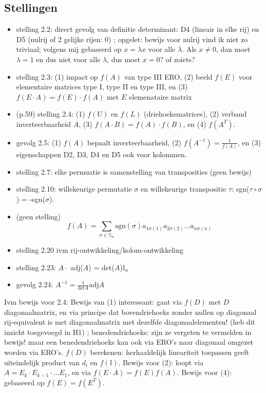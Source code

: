 \documentclass{article}
\begin{document}
\subsection{Stellingen}
\begin{itemize}
    \item stelling 2.2: direct gevolg van definitie determinant: D4 (lineair in elke rij) en D5 (nulrij of 2 gelijke rijen: 0) ; opgelet: bewijs voor nulrij vind ik niet zo triviaal; volgens mij gebaseerd op $x = \lambda x$ voor alle $\lambda$. Als $x \neq 0$, dan moet $\lambda=1$ en dus niet voor alle $\lambda$, dus moet $x=0$? of zoiets? 
    \item stelling 2.3: (1) impact op $f(A)$ van type III ERO, (2) beeld $f(E)$ voor elementaire matrices type I, type II en type III, en (3) $f(E\cdot A)= f(E)\cdot f(A)$ met $E$ elemenataire matrix
    \item (p.59) stelling 2.4: (1) $f(U)$ en $f(L)$ (driehoeksmatrices), (2) verband inverteerbaarheid $A$, (3) $f(A\cdot B) = f(A) \cdot f(B)$, en (4) $f(A^T)$.  
    \item gevolg 2.5: (1) $f(A)$ bepaalt inverteerbaarheid, (2) $f(A^{-1}) = \frac{1}{f(A)}$, en (3) eigenschappen D2, D3, D4 en D5 ook voor kolommen. 
    \item stelling 2.7: elke permuatie is samenstelling van transposities (geen bewijs) 
    \item stelling 2.10: willekeurige permutatie $\sigma$ en willekeurige transpositie $\tau$: sgn($\tau\circ\sigma$) = -sgn($ \sigma$). 
    \item (geen stelling) \[ f(A) = \sum_{\sigma \in \mathbb{S}_n} \text{sgn} (\sigma) a_{1\sigma(1)} a_{2\sigma(2)} ... a_{n \sigma(n)} \] 
    \item stelling 2.20 ivm rij-ontwikkeling/kolom-ontwikkeling
    \item stelling 2.23: $A\cdot$ adj($A$) = det($A$)$\mathbb{I}_n$
    \item gevolg 2.24: $A^{-1} = \frac{1}{\text{det}A} \text{adj}A$
\end{itemize}

Ivm bewijs voor 2.4: Bewijs van (1) interessant: gaat via $f(D)$ met $D$ diagonaalmatrix, en via principe dat bovendriehoeks zonder nullen op diagonaal rij-equivalent is met diagonaalmatrix met dezelfde diagonaalelementen! (heb dit inzicht toegevoegd in H1) ; benedendriehoeks: zijn ze vergeten te vermelden in bewijs! maar een benedendriehoeks kan ook via ERO's naar diagonaal omgezet worden via ERO's. $f(D)$ berekenen: herhaaldelijk lineariteit toepassen geeft uiteindelijk product van $d_i$ en $f(\mathbb{I})$. Bewijs voor (2): loopt via $A = E_k \cdot E_{k-1} \cdot ... E_1$, en via $f(E\cdot A) = f(E)f(A)$. Bewijs voor (4): gebaseerd op $f(E)=f(E^T)$. 
\end{document}
